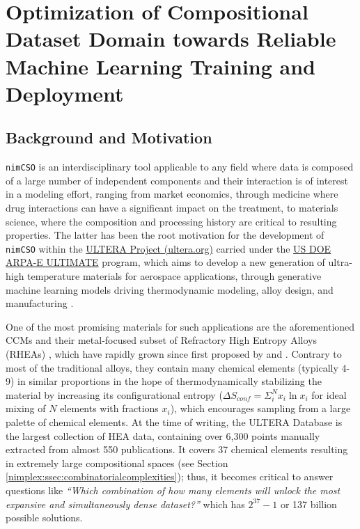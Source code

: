 \chapter{Optimization of Compositional Dataset Domain towards Reliable Machine Learning Training and Deployment} \label{chap:nimcso}


\section{Background and Motivation} \label{nimcso:sec:background}

\texttt{nimCSO} is an interdisciplinary tool applicable to any field
where data is composed of a large number of independent components and
their interaction is of interest in a modeling effort, ranging from
market economics, through medicine where drug interactions can have a
significant impact on the treatment, to materials science, where the
composition and processing history are critical to resulting properties.
The latter has been the root motivation for the development of
\texttt{nimCSO} within the \href{https://ultera.org}{ULTERA Project
(ultera.org)} carried under the
\href{https://arpa-e.energy.gov/?q=arpa-e-programs/ultimate}{US DOE
ARPA-E ULTIMATE} program, which aims to develop a new generation of
ultra-high temperature materials for aerospace applications, through
generative machine learning models \cite{Debnath2021} driving
thermodynamic modeling, alloy design, and manufacturing \cite{Li2024}.

One of the most promising materials for such applications are the
aforementioned CCMs and their metal-focused subset of Refractory High
Entropy Alloys (RHEAs) \cite{Senkov2018}, which have rapidly grown since first proposed by
\citet{Cantor2004} and
\citet{Yeh2004}. Contrary to most of
the traditional alloys, they contain many chemical elements (typically
4-9) in similar proportions in the hope of thermodynamically stabilizing
the material by increasing its configurational entropy
(\(\Delta S_{conf} = \Sigma_i^N x_i \ln{x_i}\) for ideal mixing of \(N\)
elements with fractions \(x_i\)), which encourages sampling from a large
palette of chemical elements. At the time of writing, the ULTERA
Database is the largest collection of HEA data, containing over 6,300
points manually extracted from almost 550 publications. It covers 37
chemical elements resulting in extremely large compositional spaces (see Section \ref{nimplex:ssec:combinatorialcomplexities});
thus, it becomes critical to answer questions like \emph{``Which
combination of how many elements will unlock the most expansive and
simultaneously dense dataset?''} which has \(2^{37}-1\) or 137 billion
possible solutions.


